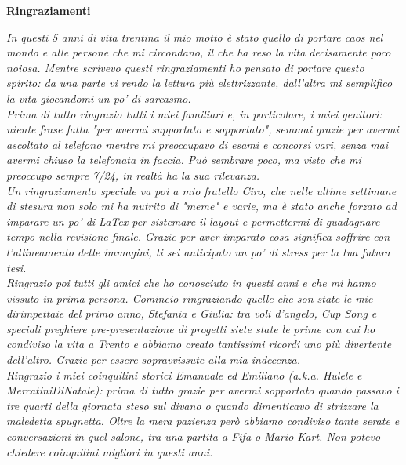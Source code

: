\thispagestyle{empty}

\begin{center}
  {\bf \Huge Ringraziamenti}
\end{center}

\vspace{3cm}


\emph{
  In questi 5 anni di vita trentina il mio motto è stato quello di portare caos nel mondo e alle persone che mi circondano, il che ha reso la vita decisamente poco noiosa. Mentre scrivevo questi ringraziamenti ho pensato di portare questo spirito: da una parte vi rendo la lettura più elettrizzante, dall'altra mi semplifico la vita giocandomi un po' di sarcasmo. \\
  Prima di tutto ringrazio tutti i miei familiari e, in particolare, i miei genitori: niente frase fatta "per avermi supportato e sopportato", semmai grazie per avermi ascoltato al telefono mentre mi preoccupavo di esami e concorsi vari, senza mai avermi chiuso la telefonata in faccia. Può sembrare poco, ma visto che mi preoccupo sempre 7/24, in realtà ha la sua rilevanza. \\
  Un ringraziamento speciale va poi a mio fratello Ciro, che nelle ultime settimane di stesura non solo mi ha nutrito di "meme" e varie, ma è stato anche forzato ad imparare un po' di LaTex per sistemare il layout e permettermi di guadagnare tempo nella revisione finale. Grazie per aver imparato cosa significa soffrire con l'allineamento delle immagini, ti sei anticipato un po' di stress per la tua futura tesi. \\
  Ringrazio poi tutti gli amici che ho conosciuto in questi anni e che mi hanno vissuto in prima persona. Comincio ringraziando quelle che son state le mie dirimpettaie del primo anno, Stefania e Giulia: tra voli d'angelo, Cup Song e speciali preghiere pre-presentazione di progetti siete state le prime con cui ho condiviso la vita a Trento e abbiamo creato tantissimi ricordi uno più divertente dell'altro. Grazie per essere sopravvissute alla mia indecenza. \\
  Ringrazio i miei coinquilini storici Emanuale ed Emiliano (a.k.a. Hulele e MercatiniDiNatale): prima di tutto grazie per avermi sopportato quando passavo i tre quarti della giornata steso sul divano o quando dimenticavo di strizzare la maledetta spugnetta. Oltre la mera pazienza però abbiamo condiviso tante serate e conversazioni in quel salone, tra una partita a Fifa o Mario Kart. Non potevo chiedere coinquilini migliori in questi anni. \\
}
